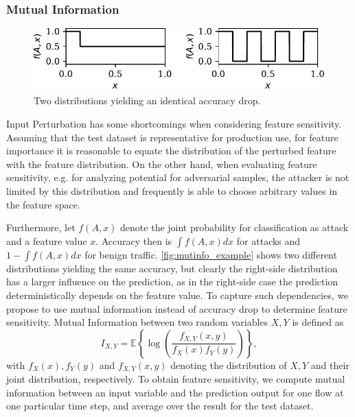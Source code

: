 \documentclass[conference]{IEEEtran}
\newcommand\note[2]{{\color{#1}#2}}
\newcommand\todo[1]{{\note{red}{TODO: #1}}}
\begin{document}
\subsubsection{Mutual Information}
\begin{figure}
\includegraphics[width=\columnwidth]{../plots/mutinfo_example.pdf}
\caption{Two distributions yielding an identical accuracy drop.}
\label{fig:mutinfo_example}
\end{figure}
Input Perturbation has some shortcomings when considering feature sensitivity. Assuming that the test dataset is representative for production use, for feature importance it is reasonable to equate the distribution of the perturbed feature with the feature distribution. On the other hand, when evaluating feature sensitivity, e.g. for analyzing potential for adversarial samples, the attacker is not limited by this distribution and frequently is able to choose arbitrary values in the feature space.

Furthermore, let $f(A,x)$  denote the joint probability
for classification as attack and a feature value $x$. Accuracy then is $\int f(A,x) dx$ for attacks and $1-\int f(A,x) dx$ for benign traffic.
\autoref{fig:mutinfo_example} shows two different distributions
yielding the same accuracy, but clearly the right-side distribution has a larger influence on the prediction, as in the right-side case the prediction deterministically depends on the feature value.
To capture such dependencies, we propose to use mutual information instead of accuracy drop to determine feature sensitivity.
Mutual Information between two random variables $X,Y$ is defined as 
\begin{equation}
I_{X,Y} = \mathbb E \left\{ \log\left(\frac{f_{X,Y}(x,y)}{f_X(x)f_Y(y)}\right) \right\},
\end{equation}
with $f_X(x), f_Y(y)$ and $f_{X,Y}(x,y)$ denoting the distribution of $X,Y$ and their joint distribution, respectively. To obtain feature sensitivity, we compute mutual information between an input variable and the prediction output for one flow at one particular time step, and average over the result for the test dataset.
\end{document}
